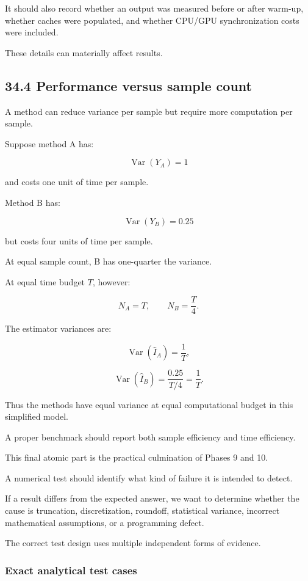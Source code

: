 It should also record whether an output was measured before or after warm-up, whether caches were populated, and whether CPU/GPU synchronization costs were included.

These details can materially affect results.

\subsection{34.4 Performance versus sample count}\label{02-foundations-ii-ch031-performance-versus-sample-count}

A method can reduce variance per sample but require more computation per sample.

Suppose method A has:

\[ \operatorname{Var}(Y_A)=1 \]

and costs one unit of time per sample.

Method B has:

\[ \operatorname{Var}(Y_B)=0.25 \]

but costs four units of time per sample.

At equal sample count, B has one-quarter the variance.

At equal time budget \(T\), however:

\[ N_A=T, \qquad N_B=\frac T4. \]

The estimator variances are:

\[ \operatorname{Var}(\hat I_A)=\frac1T, \]

\[ \operatorname{Var}(\hat I_B) = \frac{0.25}{T/4} =\frac1T. \]

Thus the methods have equal variance at equal computational budget in this simplified model.

A proper benchmark should report both sample efficiency and time efficiency.

This final atomic part is the practical culmination of Phases 9 and 10.

A numerical test should identify what kind of failure it is intended to detect.

If a result differs from the expected answer, we want to determine whether the cause is truncation, discretization, roundoff, statistical variance, incorrect mathematical assumptions, or a programming defect.

The correct test design uses multiple independent forms of evidence.

\subsubsection{Exact analytical test cases}\label{02-foundations-ii-ch031-exact-analytical-test-cases}

